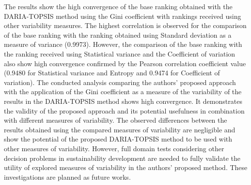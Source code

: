 \documentclass[5p,times]{elsarticle}
\begin{document}
The results show the high convergence of the base ranking obtained with the DARIA-TOPSIS method using the Gini coefficient with rankings received using other variability measures. The highest correlation is observed for the comparison of the base ranking with the ranking obtained using Standard deviation as a measure of variance (0.9973). However, the comparison of the base ranking with the ranking received using Statistical variance and the Coefficient of variation also show high convergence confirmed by the Pearson correlation coefficient value (0.9480 for Statistical variance and Entropy and 0.9474 for Coefficient of variation). The conducted analysis comparing the authors' proposed approach with the application of the Gini coefficient as a measure of the variability of the results in the DARIA-TOPSIS method shows high convergence. It demonstrates the validity of the proposed approach and its potential usefulness in combination with different measures of variability. The observed differences between the results obtained using the compared measures of variability are negligible and show the potential of the proposed DARIA-TOPSIS method to be used with other measures of variability. However, full domain tests considering other decision problems in sustainability development are needed to fully validate the utility of explored measures of variability in the authors' proposed method. These investigations are planned as future works.
\end{document}
